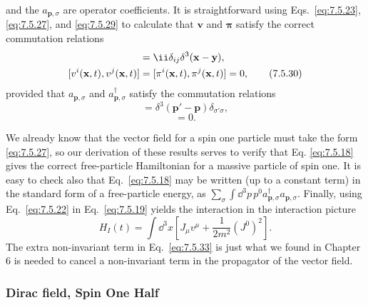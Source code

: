 and the $a_{\mathbf p,\sigma}$ are operator coefficients. It is straightforward
using Eqs.~\eqref{eq:7.5.23}, \eqref{eq:7.5.27}, and \eqref{eq:7.5.29} to calculate that $\mathbf v$ and
$\boldsymbol\pi$ satisfy the correct commutation relations
\begin{align}
[v^i(\mathbf x,t),\pi^j(\mathbf y,t)]&=\ii\delta_{ij}\delta^3(\mathbf x-\mathbf y),
\notag\\
[v^i(\mathbf x,t),v^j(\mathbf x,t)]
&=[\pi^i(\mathbf x,t),\pi^j(\mathbf x,t)]=0,
\tag{7.5.30}\label{eq:7.5.30}
\end{align}
provided that $a_{\mathbf p,\sigma}$ and $a^\dagger_{\mathbf p,\sigma}$ satisfy
the commutation relations
\begin{equation}
[a_{\mathbf p,\sigma},a^\dagger_{\mathbf p',\sigma'}]
=\delta^3(\mathbf p'-\mathbf p)\delta_{\sigma'\sigma},
\tag{7.5.31}\label{eq:7.5.31}
\end{equation}
\begin{equation}
[a_{\mathbf p,\sigma},a_{\mathbf p',\sigma'}]=0.
\tag{7.5.32}\label{eq:7.5.32}
\end{equation}

We already know that the vector field for a spin one particle must take the
form \eqref{eq:7.5.27}, so our derivation of these results serves to verify that Eq.
\eqref{eq:7.5.18} gives the correct free-particle Hamiltonian for a massive particle
of spin one. It is easy to check also that Eq.~\eqref{eq:7.5.18} may be written (up to
a constant term) in the standard form of a free-particle energy, as
$\sum_\sigma\int \dd^3p\,p^0a^\dagger_{\mathbf p,\sigma}a_{\mathbf p,\sigma}$.
Finally, using Eq.~\eqref{eq:7.5.22} in Eq.~\eqref{eq:7.5.19} yields the interaction in the
interaction picture
\begin{equation}
H_I(t)=\int \dd^3x\left[J_\mu v^\mu+\frac1{2m^2}(J^0)^2\right].
\tag{7.5.33}\label{eq:7.5.33}
\end{equation}
The extra non-invariant term in Eq.~\eqref{eq:7.5.33} is just what we found in Chapter
6 is needed to cancel a non-invariant term in the propagator of the vector
field.

\subsubsection*{Dirac field, Spin One Half}

